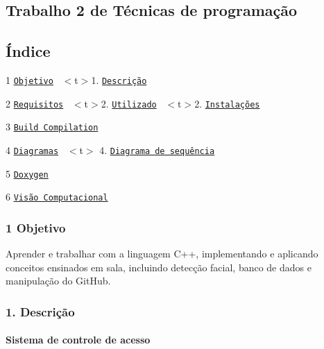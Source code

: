 \subsection*{Trabalho 2 de Técnicas de programação}

\subsection*{Índice}


\begin{DoxyItemize}
\item 1 \href{#1-objetivo}{\tt Objetivo}~\newline
 $<$t$>$1. \href{#11-descrição}{\tt Descrição}~\newline

\item 2 \href{#2-requisitos}{\tt Requisitos}~\newline
 $<$t$>$2. \href{#21-utilizado}{\tt Utilizado}~\newline
 $<$t$>$2. \href{#22-instalações}{\tt Instalações}~\newline

\item 3 \href{#3-build-compilation}{\tt Build Compilation}~\newline

\item 4 \href{#4-diagramas}{\tt Diagramas}~\newline
 $<$t$>$ 4. \href{#41-diagrama-de-sequência}{\tt Diagrama de sequência}
\item 5 \href{#5-doxygen}{\tt Doxygen}
\item 6 \href{#6-visão-computacional}{\tt Visão Computacional}
\end{DoxyItemize}

\subsubsection*{1 Objetivo}

Aprender e trabalhar com a linguagem C++, implementando e aplicando conceitos ensinados em sala, incluindo detecção facial, banco de dados e manipulação do Git\+Hub. 

\subsubsection*{1. Descrição}

\paragraph*{Sistema de controle de acesso}

